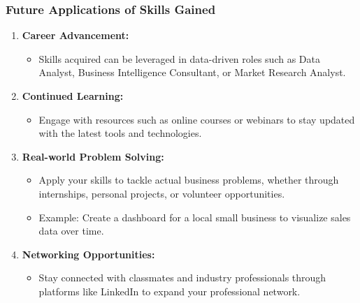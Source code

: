 \documentclass[aspectratio=169]{beamer}
\begin{document}
\begin{frame}[fragile]
    \frametitle{Future Applications of Skills Gained}
    
    \begin{enumerate}
        \item \textbf{Career Advancement:}
        \begin{itemize}
            \item Skills acquired can be leveraged in data-driven roles such as Data Analyst, Business Intelligence Consultant, or Market Research Analyst.
        \end{itemize}
        
        \item \textbf{Continued Learning:}
        \begin{itemize}
            \item Engage with resources such as online courses or webinars to stay updated with the latest tools and technologies.
        \end{itemize}
        
        \item \textbf{Real-world Problem Solving:}
        \begin{itemize}
            \item Apply your skills to tackle actual business problems, whether through internships, personal projects, or volunteer opportunities. 
            \item Example: Create a dashboard for a local small business to visualize sales data over time.
        \end{itemize}
        
        \item \textbf{Networking Opportunities:}
        \begin{itemize}
            \item Stay connected with classmates and industry professionals through platforms like LinkedIn to expand your professional network.
        \end{itemize}
    \end{enumerate}
\end{frame}
\end{document}
